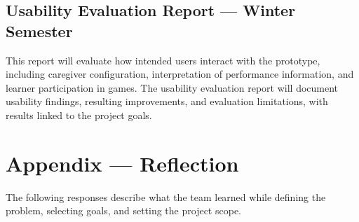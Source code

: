 \documentclass{article}
\begin{document}
\subsection{Usability Evaluation Report --- Winter Semester}

This report will evaluate how intended users interact with the
prototype, including caregiver configuration, interpretation of
performance information, and learner participation in games.
The usability evaluation report will document usability findings, resulting
improvements, and
evaluation limitations, with results linked to the project goals.




\newpage{}

\section*{Appendix --- Reflection}

The following responses describe what the team learned while defining the
problem, selecting goals, and setting the project scope.
\end{document}
